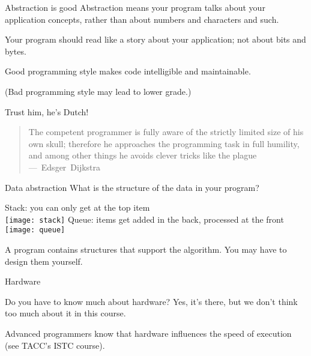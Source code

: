 \begin{block}{Abstraction is good}
  \label{sl:abstraction-good}
  Abstraction means your program talks about your application
  concepts, rather than about numbers and characters and such.

  Your program should read like a story about your application; not
  about bits and bytes.

  Good programming style makes code intelligible and maintainable.

  (Bad programming style may lead to lower grade.)
\end{block}

\begin{block}{Trust him, he's Dutch!}
  \label{sl:dijkstra-trick}
  \begin{quotation}
    \raggedright\noindent
    The competent programmer is fully aware of the strictly limited
    size of his own skull; therefore he approaches the programming
    task in full humility, and among other things he avoids clever
    tricks like the plague ---~Edsger~Dijkstra
  \end{quotation}  
\end{block}

\begin{block}{Data abstraction}
  \label{sl:stackabstract}
  What is the structure of the data in your program?

  \begin{multicols}{2}
    Stack: you can only get at the top item\\

    \texttt{[image: stack]}
    \vfill\columnbreak
    Queue: items get added in the back, processed at the front\\

    \texttt{[image: queue]}
  \end{multicols}
  A program contains structures that support the algorithm. You may
  have to design them yourself.
\end{block}

 {Hardware}

\begin{block}{Do you have to know much about hardware?}
  \label{sl:hardwarevid}
  Yes, it's there, but we don't think too much about it in this course.

  Advanced programmers know that hardware influences the speed of
  execution (see TACC's ISTC course).
\end{block}

